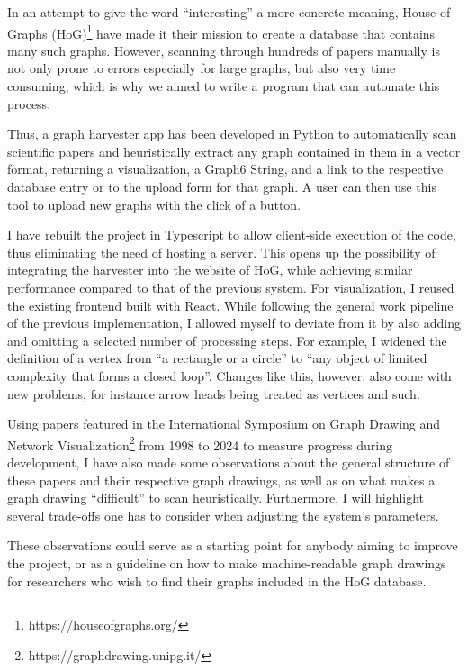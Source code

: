 \documentclass[practical,english]{info1thesis}
\begin{document}
In an attempt to give the word ``interesting'' a more concrete meaning, House of Graphs (HoG)\footnote{https://houseofgraphs.org/} have made it their mission to create a database that contains many such graphs.
However, scanning through hundreds of papers manually is not only prone to errors especially for large graphs, but also very time consuming, which is why we aimed to write a program that can automate this process.


Thus, a graph harvester app has been developed in Python to automatically scan scientific papers and heuristically extract any graph contained in them in a vector format, returning a visualization, a Graph6 String, and a link to the respective database entry or to the upload form for that graph.
A user can then use this tool to upload new graphs with the click of a button.


I have rebuilt the project in Typescript to allow client-side execution of the code, thus eliminating the need of hosting a server.
This opens up the possibility of integrating the harvester into the website of HoG, while achieving similar performance compared to that of the previous system.
For visualization, I reused the existing frontend built with React.
While following the general work pipeline of the previous implementation, I allowed myself to deviate from it by also adding and omitting a selected number of processing steps.
For example, I widened the definition of a vertex from ``a rectangle or a circle'' to ``any object of limited complexity that forms a closed loop''. 
Changes like this, however, also come with new problems, for instance arrow heads being treated as vertices and such.


Using papers featured in the International Symposium on Graph Drawing and Network Visualization\footnote{https://graphdrawing.unipg.it/} from 1998 to 2024 to measure progress during development, I have also made some observations about the general structure of these papers and their respective graph drawings, as well as on what makes a graph drawing ``difficult'' to scan heuristically.
Furthermore, I will highlight several trade-offs one has to consider when adjusting the system's parameters.


These observations could serve as a starting point for anybody aiming to improve the project, or as a guideline on how to make machine-readable graph drawings for researchers who wish to find their graphs included in the HoG database.
\end{document}
